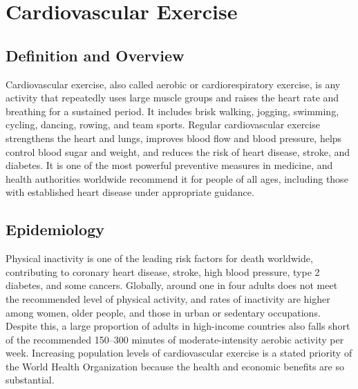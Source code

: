 \chapter{Cardiovascular Exercise}

\section*{Definition and Overview}
Cardiovascular exercise, also called aerobic or cardiorespiratory exercise, is any activity that repeatedly uses large muscle groups and raises the heart rate and breathing for a sustained period. It includes brisk walking, jogging, swimming, cycling, dancing, rowing, and team sports. Regular cardiovascular exercise strengthens the heart and lungs, improves blood flow and blood pressure, helps control blood sugar and weight, and reduces the risk of heart disease, stroke, and diabetes. It is one of the most powerful preventive measures in medicine, and health authorities worldwide recommend it for people of all ages, including those with established heart disease under appropriate guidance.

\section*{Epidemiology}
Physical inactivity is one of the leading risk factors for death worldwide, contributing to coronary heart disease, stroke, high blood pressure, type 2 diabetes, and some cancers. Globally, around one in four adults does not meet the recommended level of physical activity, and rates of inactivity are higher among women, older people, and those in urban or sedentary occupations. Despite this, a large proportion of adults in high-income countries also falls short of the recommended 150--300 minutes of moderate-intensity aerobic activity per week. Increasing population levels of cardiovascular exercise is a stated priority of the World Health Organization because the health and economic benefits are so substantial.

